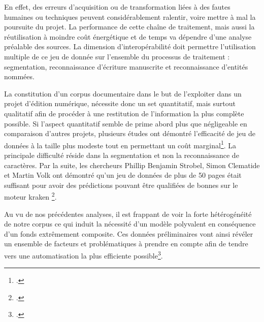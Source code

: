 	En effet, des erreurs d’acquisition ou de transformation liées à des fautes humaines ou techniques peuvent considérablement ralentir, voire mettre à mal la poursuite du projet. La performance de cette chaîne de traitement, mais aussi la réutilisation à moindre coût énergétique et de temps va dépendre d'une analyse préalable des sources. La dimension d'interopérabilité doit permettre l'utilisation multiple de ce jeu de donnée sur l'ensemble du processus de traitement : segmentation, reconnaissance d'écriture manuscrite et reconnaissance d'entités nommées. \newpar
	
	La constitution d'un corpus documentaire dans le but de l'exploiter dans un projet d'édition numérique, nécessite donc un set quantitatif, mais surtout qualitatif afin de procéder à une restitution de l'information la plus complète possible. Si l'aspect quantitatif semble de prime abord plus que négligeable en comparaison d'autres projets, plusieurs études ont démontré l'efficacité de jeu de données à la taille plus modeste tout en permettant un coût marginal\footcite{sanchezSetBenchmarksHandwritten2019}. La principale difficulté réside dans la segmentation et non la reconnaissance de caractères. Par la suite, les chercheurs Phillip Benjamin Strobel, Simon Clematide et Martin Volk ont démontré qu'un jeu de données de plus de 50 pages était suffisant pour avoir des prédictions pouvant être qualifiées de bonnes sur le moteur \gls{kraken} \footcite{strobelHowMuchData2020}.
	
	Au vu de nos précédentes analyses, il est frappant de voir la forte hétérogénéité de notre corpus ce qui induit la nécessité d'un modèle polyvalent en conséquence d'un fonds extrêmement composite. 
	Ces données préliminaires vont ainsi révéler un ensemble de facteurs et problématiques à prendre en compte afin de tendre vers une automatisation la plus efficiente possible\footcite{chagueDeuxSieclesSources2019a}.
	


